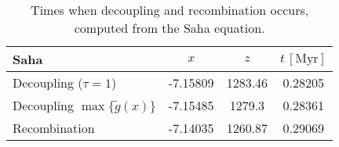 \begin{table}[h]
\centering
\caption{Times when decoupling and recombination occurs, computed from the Saha equation.}
\label{tab:M2:results:dec_and_rec_times_Saha}
\begin{tabular}{l|ccc}
\toprule
                               Saha &      $x$ &     $z$ & $t\,\mathrm{[Myr]}$ \\
\midrule
              Decoupling ($\tau=1$) & -7.15809 & 1283.46 &             0.28205 \\
Decoupling $\max\{ \tilde{g}(x) \}$ & -7.15485 &  1279.3 &             0.28361 \\
                      Recombination & -7.14035 & 1260.87 &             0.29069 \\
\bottomrule
\end{tabular}
\end{table}
